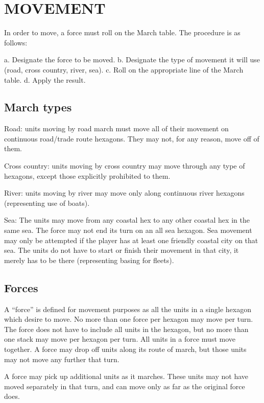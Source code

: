 \section{MOVEMENT}

In order to move, a force must roll on the March table. The procedure is as follows:

a. Designate the force to be moved.
b. Designate the type of movement it will use (road, cross country, river, sea).
c. Roll on the appropriate line of the March table.
d. Apply the result.

\subsection{March types}

Road: units moving by road march must move all of their movement on continuous road/trade route hexagons. They may not, for any reason, move off of them.

Cross country: units moving by cross country may move through any type of hexagons, except those explicitly prohibited to them.

River: units moving by river may move only along continuous river hexagons (representing use of boats).

Sea: The units may move from any coastal hex to any other coastal hex in the same sea. The force may not end its turn on an all sea hexagon. Sea movement may only be attempted if the player has at least one friendly coastal city on that sea. The units do not have to start or finish their movement in that city, it merely has to be there (representing basing for fleets).

\subsection{Forces}

A “force” is defined for movement purposes as all the units in a single hexagon which desire to move. No more than one force per hexagon may move per turn. The force does not have to include all units in the hexagon, but no more than one stack may move per hexagon per turn. All units in a force must move together. A force may drop off units along its route of march, but those units may not move any further that turn.

A force may pick up additional units as it marches. These units may not have moved separately in that turn, and can move only as far as the original force does.

